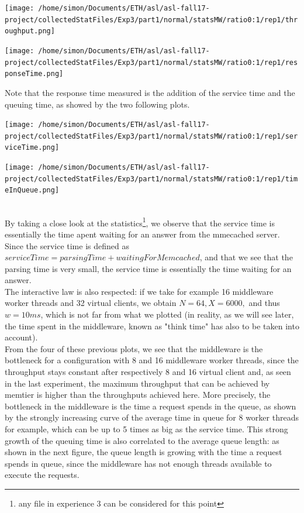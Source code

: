 \documentclass[11pt,a4paper]{article}
\begin{document}
\begin{center}
\texttt{[image: /home/simon/Documents/ETH/asl/asl-fall17-project/collectedStatFiles/Exp3/part1/normal/statsMW/ratio0:1/rep1/throughput.png]}
\end{center}
\begin{center}
\texttt{[image: /home/simon/Documents/ETH/asl/asl-fall17-project/collectedStatFiles/Exp3/part1/normal/statsMW/ratio0:1/rep1/responseTime.png]}
\end{center}

Note that the response time measured is the addition of the service time and the queuing time, as showed by the two following plots. 
\\
\begin{minipage}{0.5\linewidth}
\texttt{[image: /home/simon/Documents/ETH/asl/asl-fall17-project/collectedStatFiles/Exp3/part1/normal/statsMW/ratio0:1/rep1/serviceTime.png]}
\end{minipage}
\hfill
\begin{minipage}{0.5\linewidth}
\texttt{[image: /home/simon/Documents/ETH/asl/asl-fall17-project/collectedStatFiles/Exp3/part1/normal/statsMW/ratio0:1/rep1/timeInQueue.png]}
\end{minipage}
\\
By taking a close look at the statistics\footnote{any file in experience 3 can be considered for this point}, we observe that the service time is essentially the time apent waiting for an answer from the mmecached server. Since the service time is defined as \(serviceTime = parsingTime + waitingForMemcached\), and that we see that the parsing time is very small, the service time is essentially the time waiting for an answer. 
\\
The interactive law is also respected: if we take for example 16 middleware worker threads and 32 virtual clients, we obtain \(N = 64, X = 6000,\) and thus \(w = 10 ms\), which is not far from what we plotted (in reality, as we will see later, the time spent in the middleware, known as "think time" has also to be taken into account). 
\\
From the four of these previous plots, we see that the middleware is the bottleneck for a configuration with 8 and 16 middleware worker threads, since the throughput stays constant after respectively 8 and 16 virtual client and, as seen in the last experiment, the maximum throughput that can be achieved by memtier is higher than the throughputs achieved here. More precisely, the bottleneck in the middleware is the time a request spends in the queue, as shown by the strongly increasing curve of the average time in queue for 8 worker threads for example, which can be up to 5 times as big as the service time. This strong growth of the queuing time is also correlated to the average queue length: as shown in the next figure, the queue length is growing with the time a request spends in queue, since the middleware has not enough threads available to execute the requests. 
\end{document}
